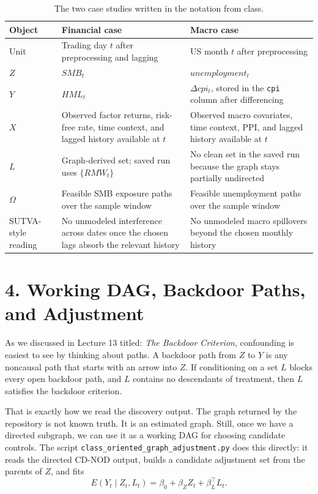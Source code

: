 \documentclass[12pt]{article}
\begin{document}
\begin{table}[H]
\centering
\small
\begin{tabularx}{\textwidth}{p{} X X}
\toprule
\textbf{Object} & \textbf{Financial case} & \textbf{Macro case} \\
\midrule
Unit & Trading day \(t\) after preprocessing and lagging & US month \(t\) after preprocessing \\
\(Z\) & \(SMB_t\) & \(unemployment_t\) \\
\(Y\) & \(HML_t\) & \(\Delta cpi_t\), stored in the \texttt{cpi} column after differencing \\
\(X\) & Observed factor returns, risk-free rate, time context, and lagged history available at \(t\) & Observed macro covariates, time context, PPI, and lagged history available at \(t\) \\
\(L\) & Graph-derived set; saved run uses \(\{RMW_t\}\) & No clean set in the saved run because the graph stays partially undirected \\
\(\Omega\) & Feasible SMB exposure paths over the sample window & Feasible unemployment paths over the sample window \\
SUTVA-style reading & No unmodeled interference across dates once the chosen lags absorb the relevant history & No unmodeled macro spillovers beyond the chosen monthly history \\
\bottomrule
\end{tabularx}
\caption{The two case studies written in the notation from class.}
\end{table}

\section*{4. Working DAG, Backdoor Paths, and Adjustment}

As we discussed in Lecture 13 titled: \textit{The Backdoor Criterion}, confounding is easiest to
see by thinking about paths. A backdoor path from \(Z\) to \(Y\) is any noncausal path that starts
with an arrow into \(Z\). If conditioning on a set \(L\) blocks every open backdoor path, and \(L\)
contains no descendants of treatment, then \(L\) satisfies the backdoor criterion.

That is exactly how we read the discovery output. The graph returned by the repository is not known
truth. It is an estimated graph. Still, once we have a directed subgraph, we can use it as a
working DAG for choosing candidate controls. The script \texttt{class\_oriented\_graph\_adjustment.py}
does this directly: it reads the directed CD-NOD output, builds a candidate adjustment set from the
parents of \(Z\), and fits
\[
E(Y_t \mid Z_t, L_t) = \beta_0 + \beta_Z Z_t + \beta_L^\top L_t.
\]
\end{document}
